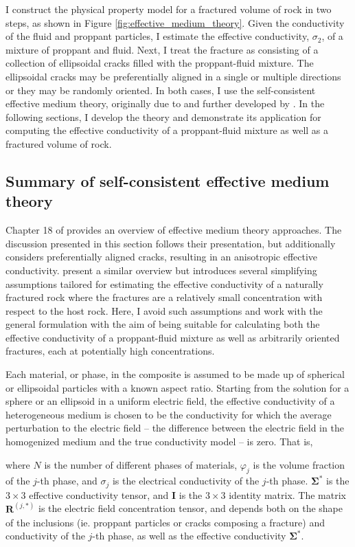 I construct the physical property model for a fractured volume of rock in two steps, as shown in Figure \ref{fig:effective_medium_theory}. Given the conductivity of the fluid and proppant particles, I estimate the effective conductivity, $\sigma_2$, of a mixture of proppant and fluid. Next, I treat the fracture as consisting of a collection of ellipsoidal cracks filled with the proppant-fluid mixture. The ellipsoidal cracks may be preferentially aligned in a single or multiple directions or they may be randomly oriented. In both cases, I use the self-consistent effective medium theory, originally due to \cite{Bruggeman1935} and further developed by \cite{Landauer1952, Landauer1978}. In the following sections, I develop the theory and demonstrate its application for computing the effective conductivity of a proppant-fluid mixture as well as a fractured volume of rock.




\subsection{Summary of self-consistent effective medium theory}
\label{sect:emt_math}

Chapter 18 of \cite{Torquato2002} provides an overview of effective medium theory approaches. The discussion presented in this section follows their presentation, but additionally considers preferentially aligned cracks, resulting in an anisotropic effective conductivity. \cite{Berryman2013} present a similar overview but introduces several simplifying assumptions tailored for estimating the effective conductivity of a naturally fractured rock where the fractures are a relatively small concentration with respect to the host rock. Here, I avoid such assumptions and work with the general formulation with the aim of being suitable for calculating both the effective conductivity of a proppant-fluid mixture as well as arbitrarily oriented fractures, each at potentially high concentrations.

Each material, or phase, in the composite is assumed to be made up of spherical or ellipsoidal particles with a known aspect ratio. Starting from the solution for a sphere or an ellipsoid in a uniform electric field, the effective conductivity of a heterogeneous medium is chosen to be the conductivity for which the average perturbation to the electric field -- the difference between the electric field in the homogenized medium and the true conductivity model -- is zero. That is,

where $N$ is the number of different phases of materials, $\varphi_j$ is the volume fraction of the $j$-th phase, and $\sigma_j$ is the electrical conductivity of the $j$-th phase. $\boldsymbol{\Sigma^*}$ is the $3 \times 3$ effective conductivity tensor, and $\mathbf{I}$ is the $3 \times 3$ identity matrix. The matrix $\mathbf{R}^{(j,*)}$ is the electric field concentration tensor, and depends both on the shape of the inclusions (ie. proppant particles or cracks composing a fracture) and conductivity of the $j$-th phase, as well as the effective conductivity $\boldsymbol{\Sigma^*}$.


